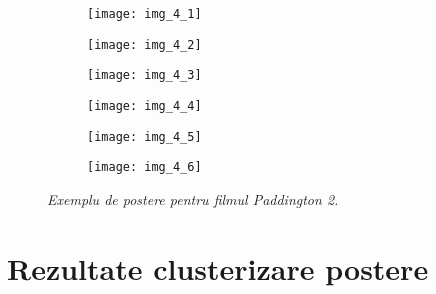\begin{figure}[!tbp]
  \begin{subfigure}[b]{0.3\textwidth}
    \texttt{[image: img\_4\_1]}
  \end{subfigure}
  \hfill
  \begin{subfigure}[b]{0.3\textwidth}
    \texttt{[image: img\_4\_2]}
  \end{subfigure}
  \hfill
  \begin{subfigure}[b]{0.3\textwidth}
    \texttt{[image: img\_4\_3]}
  \end{subfigure}
  \hfill
  \begin{subfigure}[b]{0.3\textwidth}
    \texttt{[image: img\_4\_4]}
  \end{subfigure}
  \hfill
  \begin{subfigure}[b]{0.3\textwidth}
    \texttt{[image: img\_4\_5]}
  \end{subfigure}
  \hfill
  \begin{subfigure}[b]{0.3\textwidth}
    \texttt{[image: img\_4\_6]}
  \end{subfigure}
  \caption[Exemple de postere]{\textit{Exemplu de postere pentru filmul Paddington 2.}}
\end{figure}

\section{Rezultate clusterizare postere}


